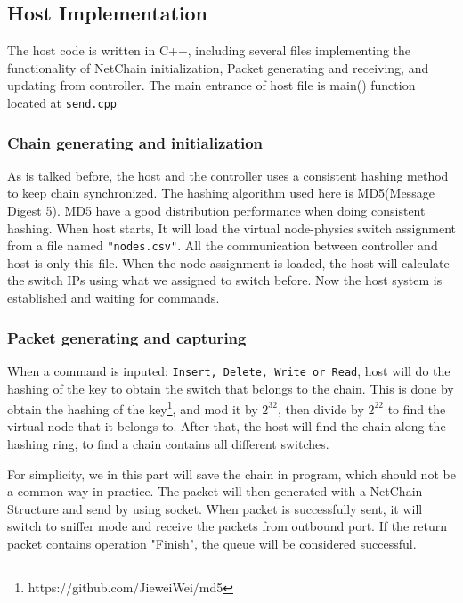 \documentclass[11pt,oneside,a4paper]{article}
\begin{document}
\subsection{Host Implementation}

The host code is written in C++, including several files implementing the functionality of NetChain initialization, Packet generating and receiving, and updating from controller. The main entrance of host file is main() function located at {\color{cyan}\texttt{send.cpp}}

\subsubsection{Chain generating and initialization}

As is talked before, the host and the controller uses a consistent hashing method to keep chain synchronized. The hashing algorithm used here is MD5(Message Digest 5)\cite{den1993collisions}. MD5 have a good distribution performance when doing consistent hashing. When host starts, It will load the virtual node-physics switch assignment from a file named {\color{violet}\texttt{"nodes.csv"}}. All the communication between controller and host is only this file. When the node assignment is loaded, the host will calculate the switch IPs using what we assigned to switch before. Now the host system is established and waiting for commands.



\subsubsection{Packet generating and capturing}
When a command is inputed: {\color{brown}\texttt{Insert, Delete, Write or Read}}, host will do the hashing of the key to obtain the switch that belongs to the chain. This is done by obtain the hashing of the key\footnote{https://github.com/JieweiWei/md5}, and mod it by $2^{32}$, then divide by $2^{22}$ to find the virtual node that it belongs to. After that, the host will find the chain along the hashing ring, to find a chain contains all different switches.

For simplicity, we in this part will save the chain in program, which should not be a common way in practice. The packet will then generated with a NetChain Structure and send by using socket. When packet is successfully sent, it will switch to sniffer mode and receive the packets from outbound port. If the return packet contains operation "Finish", the queue will be considered successful.
\end{document}
